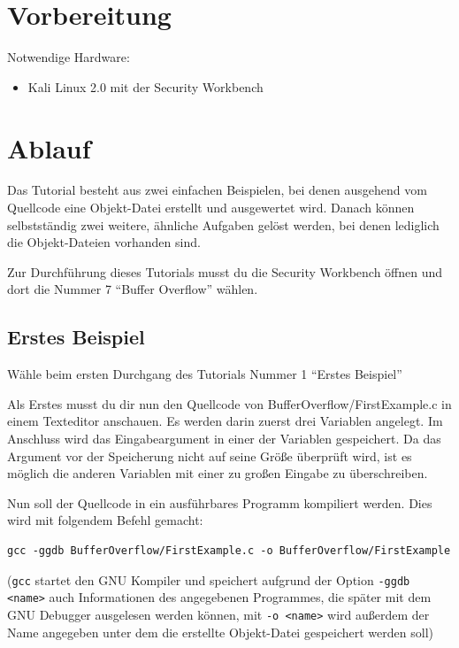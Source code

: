 \section{Vorbereitung}
Notwendige Hardware:

\begin{itemize}
	\item Kali Linux 2.0 mit der Security Workbench
\end{itemize}

\section{Ablauf}
Das Tutorial besteht aus zwei einfachen Beispielen, bei denen ausgehend vom Quellcode eine Objekt-Datei erstellt und ausgewertet wird. Danach können selbstständig zwei weitere, ähnliche Aufgaben gelöst werden, bei denen lediglich die Objekt-Dateien vorhanden sind.

Zur Durchführung dieses Tutorials musst du die Security Workbench öffnen und dort die Nummer 7 \enquote{Buffer Overflow} wählen.

\subsection{Erstes Beispiel}
Wähle beim ersten Durchgang des Tutorials Nummer 1 \enquote{Erstes Beispiel}

Als Erstes musst du dir nun den Quellcode von BufferOverflow/FirstExample.c in einem Texteditor anschauen. Es werden darin zuerst drei Variablen angelegt. Im Anschluss wird das Eingabeargument in einer der Variablen gespeichert. Da das Argument vor der Speicherung nicht auf seine Größe überprüft wird, ist es möglich die anderen Variablen mit einer zu großen Eingabe zu überschreiben.

Nun soll der Quellcode in ein ausführbares Programm kompiliert werden. Dies wird mit folgendem Befehl gemacht:
\begin{lstlisting}
gcc -ggdb BufferOverflow/FirstExample.c -o BufferOverflow/FirstExample
\end{lstlisting}
(\colorbox{altgray}{\lstinline|gcc|} startet den GNU Kompiler und speichert aufgrund der Option \colorbox{altgray}{\lstinline|-ggdb <name>|} auch Informationen des angegebenen Programmes, die später mit dem GNU Debugger ausgelesen werden können, mit \colorbox{altgray}{\lstinline|-o <name>|} wird außerdem der Name angegeben unter dem die erstellte Objekt-Datei gespeichert werden soll)

